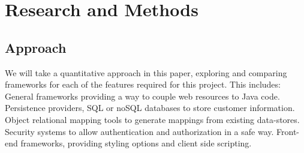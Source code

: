 \documentclass[12pt]{article}
\begin{document}
\section{Research and Methods}
\subsection{Approach}
We will take a quantitative approach in this paper, exploring and comparing frameworks for each of the features required for this project. This includes: General frameworks providing a way to couple web resources to Java code. Persistence providers, SQL or noSQL databases to store customer information. Object relational mapping tools to generate mappings from existing data-stores. Security systems to allow authentication and authorization in a safe way. Front-end frameworks, providing styling options and client side scripting.
\end{document}
